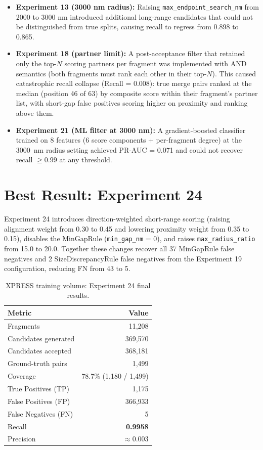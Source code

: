 \begin{itemize}
  \item \textbf{Experiment 13 (3000 nm radius):} Raising \texttt{max\_endpoint\_search\_nm}
        from 2000 to 3000 nm introduced additional long-range candidates that
        could not be distinguished from true splits, causing recall to regress
        from 0.898 to 0.865.

  \item \textbf{Experiment 18 (partner limit):} A post-acceptance filter that
        retained only the top-$N$ scoring partners per fragment was implemented
        with AND semantics (both fragments must rank each other in their top-$N$).
        This caused catastrophic recall collapse (Recall = 0.008): true merge
        pairs ranked at the median (position 46 of 63) by composite score within
        their fragment's partner list, with short-gap false positives scoring
        higher on proximity and ranking above them.

  \item \textbf{Experiment 21 (ML filter at 3000 nm):} A gradient-boosted
        classifier trained on 8 features (6 score components + per-fragment
        degree) at the 3000~nm radius setting achieved PR-AUC = 0.071 and could
        not recover recall $\geq 0.99$ at any threshold.
\end{itemize}

\section{Best Result: Experiment 24}

Experiment 24 introduces direction-weighted short-range scoring (raising alignment
weight from 0.30 to 0.45 and lowering proximity weight from 0.35 to 0.15),
disables the MinGapRule (\texttt{min\_gap\_nm} = 0), and raises
\texttt{max\_radius\_ratio} from 15.0 to 20.0. Together these changes recover all
37 MinGapRule false negatives and 2 SizeDiscrepancyRule false negatives from the
Experiment 19 configuration, reducing FN from 43 to 5.

\begin{table}[H]
\centering
\caption{XPRESS training volume: Experiment 24 final results.}
\label{tab:xpress_best}
\begin{tabular}{@{}lr@{}}
\toprule
Metric & Value \\
\midrule
Fragments & 11{,}208 \\
Candidates generated & 369{,}570 \\
Candidates accepted & 368{,}181 \\
Ground-truth pairs & 1{,}499 \\
Coverage & 78.7\% (1{,}180 / 1{,}499) \\
True Positives (TP) & 1{,}175 \\
False Positives (FP) & 366{,}933 \\
False Negatives (FN) & 5 \\
Recall & \textbf{0.9958} \\
Precision & $\approx$0.003 \\
\bottomrule
\end{tabular}
\end{table}

